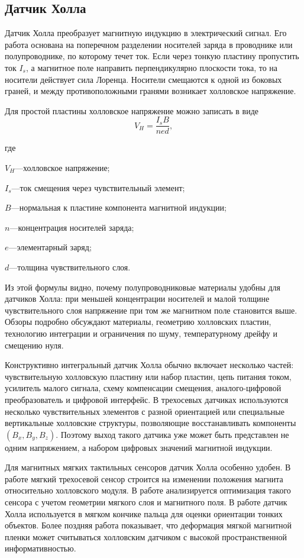 \documentclass[14pt,a4paper]{extarticle}
\newif\ifwherefirst
\newcommand{\whereitem}[2]{%
    \ifwherefirst
        \wherefirstfalse
        #1\hspace{0.25em}---\hspace{0.25em}#2\par
    \else
        \noindent\hspace*{\parindent}\hphantom{где\enspace}#1\hspace{0.25em}---\hspace{0.25em}#2\par
    \fi
}
\newenvironment{whereblock}{%
    \vspace*{-1.55\baselineskip}%
    \begingroup
    \singlespacing
    \wherefirsttrue
    \par\indent где\enspace\ignorespaces
}{%
    \par\endgroup
    \par\vspace{\baselineskip}
}
\begin{document}
\subsection{Датчик Холла}

Датчик Холла преобразует магнитную индукцию в электрический сигнал. Его работа основана на поперечном разделении носителей заряда в проводнике или полупроводнике, по которому течет ток. Если через тонкую пластину пропустить ток \(I_s\), а магнитное поле направить перпендикулярно плоскости тока, то на носители действует сила Лоренца. Носители смещаются к одной из боковых граней, и между противоположными гранями возникает холловское напряжение.

Для простой пластины холловское напряжение можно записать в виде
\begin{equation}
    V_H
    =
    \frac{I_s B}{n e d},
\end{equation}
\begin{whereblock}
\whereitem{\(V_H\)}{холловское напряжение;}
\whereitem{\(I_s\)}{ток смещения через чувствительный элемент;}
\whereitem{\(B\)}{нормальная к пластине компонента магнитной индукции;}
\whereitem{\(n\)}{концентрация носителей заряда;}
\whereitem{\(e\)}{элементарный заряд;}
\whereitem{\(d\)}{толщина чувствительного слоя.}
\end{whereblock}

Из этой формулы видно, почему полупроводниковые материалы удобны для датчиков Холла: при меньшей концентрации носителей и малой толщине чувствительного слоя напряжение при том же магнитном поле становится выше. Обзоры \cite{popovic2001,boero2003,karsenty2020,fan2021} подробно обсуждают материалы, геометрию холловских пластин, технологию интеграции и ограничения по шуму, температурному дрейфу и смещению нуля.

Конструктивно интегральный датчик Холла обычно включает несколько частей: чувствительную холловскую пластину или набор пластин, цепь питания током, усилитель малого сигнала, схему компенсации смещения, аналого-цифровой преобразователь и цифровой интерфейс. В трехосевых датчиках используются несколько чувствительных элементов с разной ориентацией или специальные вертикальные холловские структуры, позволяющие восстанавливать компоненты \((B_x,B_y,B_z)\). Поэтому выход такого датчика уже может быть представлен не одним напряжением, а набором цифровых значений магнитной индукции.

Для магнитных мягких тактильных сенсоров датчик Холла особенно удобен. В работе \cite{wang2016} мягкий трехосевой сенсор строится на изменении положения магнита относительно холловского модуля. В работе \cite{deboer2017} анализируется оптимизация такого сенсора с учетом геометрии мягкого слоя и магнитного поля. В работе \cite{rosle2019} датчик Холла используется в мягком кончике пальца для оценки ориентации тонких объектов. Более поздняя работа \cite{yan2021} показывает, что деформация мягкой магнитной пленки может считываться холловским датчиком с высокой пространственной информативностью.
\end{document}
